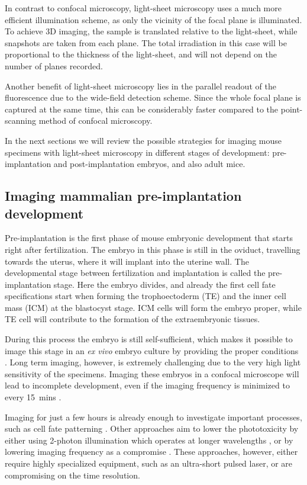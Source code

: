   In contrast to confocal microscopy, light-sheet microscopy uses a much more efficient illumination scheme, as only the vicinity of the focal plane is illuminated. To achieve 3D imaging, the sample is translated relative to the light-sheet, while snapshots are taken from each plane. The total irradiation in this case will be proportional to the thickness of the light-sheet, and will not depend on the number of planes recorded. 

  Another benefit of light-sheet microscopy lies in the parallel readout of the fluorescence due to the wide-field detection scheme. Since the whole focal plane is captured at the same time, this can be considerably faster compared to the point-scanning method of confocal microscopy.
  
  In the next sections we will review the possible strategies for imaging mouse specimens with light-sheet microscopy in different stages of development: pre-implantation and post-implantation embryos, and also adult mice.




  \subsection{Imaging mammalian pre-implantation development}
  \label{ch:mouse-intro}
    Pre-implantation is the first phase of mouse embryonic development that starts right after fertilization. The embryo in this phase is still in the oviduct, travelling towards the uterus, where it will implant into the uterine wall. The developmental stage between fertilization and implantation is called the pre-implantation stage. Here the embryo divides, and already the first cell fate specifications start when forming the trophoectoderm (TE) and the inner cell mass (ICM) at the blastocyst stage. ICM cells will form the embryo proper, while TE cell will contribute to the formation of the extraembryonic tissues.
    
    During this process the embryo is still self-sufficient, which makes it possible to image this stage in an \textit{ex vivo} embryo culture by providing the proper conditions \cite{doherty_culture_2000}. Long term imaging, however, is extremely challenging due to the very high light sensitivity of the specimens. Imaging these embryos in a confocal microscope will lead to incomplete development, even if the imaging frequency is minimized to every \SI{15}{mins} \cite{strnad_inverted_2016}.

    Imaging for just a few hours is already enough to investigate important processes, such as cell fate patterning \cite{dietrich_stochastic_2007}. Other approaches aim to lower the phototoxicity by either using 2-photon illumination which operates at longer wavelengths \cite{denk_two-photon_1990,squirrell_long-term_1999,mcdole_lineage_2011}, or by lowering imaging frequency as a compromise \cite{yamagata_long-term_2009}. These approaches, however, either require highly specialized equipment, such as an ultra-short pulsed laser, or are compromising on the time resolution.


